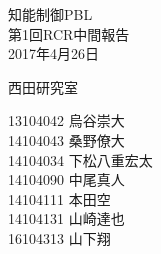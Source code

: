 \begin{titlepage}

  \vspace*{25mm}

  \begin{center}
    {\huge 知能制御PBL\\}
    \vspace{5mm}
    {\Huge 第1回RCR中間報告\\}
    \vspace{20mm}
    {\Large 2017年4月26日}

    \vspace{25mm}

    {\LARGE 西田研究室\\}

    \vspace{10mm}

    {\Large
   13104042 烏谷崇大　　\\
   14104043 桑野僚大　　\\
   14104034 下松八重宏太\\
   14104090 中尾真人　　\\
   14104111 本田空　　　\\
   14104131 山崎達也　　\\
   16104313 山下翔　　　}

  \end{center}

\end{titlepage}
